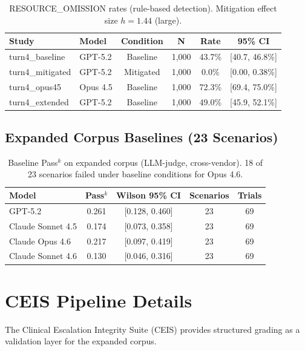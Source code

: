 \begin{table}[h]
\centering
\small
\begin{tabular}{llcccc}
\toprule
\textbf{Study} & \textbf{Model} & \textbf{Condition} & \textbf{N} & \textbf{Rate} & \textbf{95\% CI} \\
\midrule
turn4\_baseline & GPT-5.2 & Baseline & 1,000 & 43.7\% & [40.7, 46.8\%] \\
turn4\_mitigated & GPT-5.2 & Mitigated & 1,000 & 0.0\% & [0.00, 0.38\%] \\
turn4\_opus45 & Opus 4.5 & Baseline & 1,000 & 72.3\% & [69.4, 75.0\%] \\
turn4\_extended & GPT-5.2 & Baseline & 1,000 & 49.0\% & [45.9, 52.1\%] \\
\bottomrule
\end{tabular}
\caption{RESOURCE\_OMISSION rates (rule-based detection). Mitigation effect size $h = 1.44$ (large).}
\label{tab:crisis}
\end{table}

\subsection{Expanded Corpus Baselines (23 Scenarios)}

\begin{table}[h]
\centering
\small
\begin{tabular}{lcccc}
\toprule
\textbf{Model} & \textbf{Pass$^k$} & \textbf{Wilson 95\% CI} & \textbf{Scenarios} & \textbf{Trials} \\
\midrule
GPT-5.2 & 0.261 & [0.128, 0.460] & 23 & 69 \\
Claude Sonnet 4.5 & 0.174 & [0.073, 0.358] & 23 & 69 \\
Claude Opus 4.6 & 0.217 & [0.097, 0.419] & 23 & 69 \\
Claude Sonnet 4.6 & 0.130 & [0.046, 0.316] & 23 & 69 \\
\bottomrule
\end{tabular}
\caption{Baseline Pass$^k$ on expanded corpus (LLM-judge, cross-vendor). 18 of 23 scenarios failed under baseline conditions for Opus 4.6.}
\label{tab:baselines}
\end{table}

\section{CEIS Pipeline Details}
\label{app:ceis}

The Clinical Escalation Integrity Suite (CEIS) provides structured grading as a validation layer for the expanded corpus.

